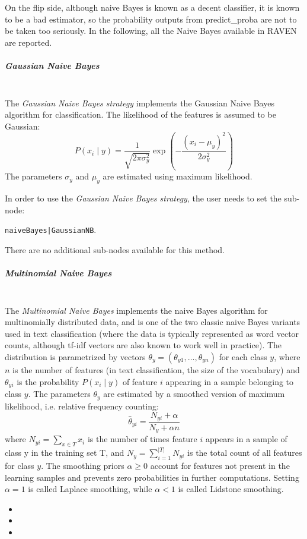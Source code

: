 On the flip side, although naive Bayes is known as a decent classifier, it is
known to be a bad estimator, so the probability outputs from predict\_proba are
not to be taken too seriously.
%
In the following, all the Naive Bayes available in RAVEN are reported.
%
\subparagraph{Gaussian Naive Bayes}
\mbox{}
\\The \textit{Gaussian Naive Bayes strategy} implements the Gaussian Naive Bayes
algorithm for classification.
%
The likelihood of the features is assumed to be Gaussian:
\begin{equation}
P(x_i \mid y) = \frac{1}{\sqrt{2\pi\sigma^2_y}} \exp\left(-\frac{(x_i -
  \mu_y)^2}{2\sigma^2_y}\right)
\end{equation}
The parameters $\sigma_y$ and $\mu_y$ are estimated using maximum likelihood.

In order to use the \textit{Gaussian Naive Bayes strategy}, the user needs to
set the sub-node:

\texttt{naiveBayes|GaussianNB}.

There are no additional sub-nodes available for this method.
%
\subparagraph{Multinomial Naive Bayes}
\mbox{}
\\The \textit{Multinomial Naive Bayes} implements the naive Bayes algorithm for
multinomially distributed data, and is one of the two classic naive Bayes
variants used in text classification (where the data is typically represented
as word vector counts, although tf-idf vectors are also known to work well in
practice).
%
The distribution is parametrized by vectors $\theta_y =
(\theta_{y1},\ldots,\theta_{yn})$ for each class $y$, where $n$ is the number of
features (in text classification, the size of the vocabulary) and $\theta_{yi}$
is the probability $P(x_i \mid y)$ of feature $i$ appearing in a sample
belonging to class $y$.
%
The parameters $\theta_y$ are estimated by a smoothed version of maximum
likelihood, i.e. relative frequency counting:
\begin{equation}
\hat{\theta}_{yi} = \frac{ N_{yi} + \alpha}{N_y + \alpha n}
\end{equation}
where $N_{yi} = \sum_{x \in T} x_i$ is the number of times feature $i$ appears
in a sample of class y in the training set T, and
$N_{y} = \sum_{i=1}^{|T|} N_{yi}$ is the total count of all features for class
$y$.
%
The smoothing priors $\alpha \ge 0$ account for features not present in the
learning samples and prevents zero probabilities in further computations.
%
Setting $\alpha = 1$ is called Laplace smoothing, while $\alpha < 1$ is called
Lidstone smoothing.
%
\begin{itemize}
  \item {}
  \item {}
  \item {}
\end{itemize}

